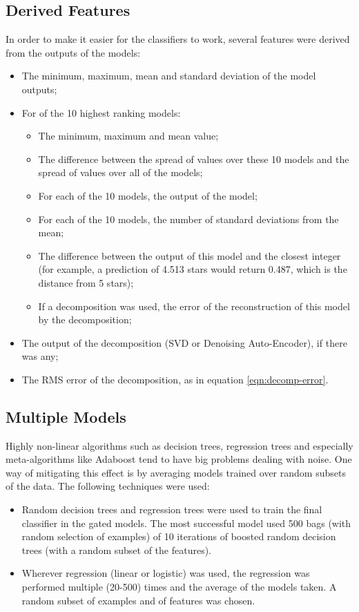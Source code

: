 \documentclass{article}
\begin{document}
\subsection{Derived Features}

In order to make it easier for the classifiers to work, several features were derived from the outputs of the models:

\begin{itemize}
\item The minimum, maximum, mean and standard deviation of the model outputs;
\item For of the 10 highest ranking models:
  \begin{itemize}
    \item The minimum, maximum and mean value;
    \item The difference between the spread of values over these 10 models and the spread of values over all of the models;
    \item For each of the 10 models, the output of the model;
    \item For each of the 10 models, the number of standard deviations from the mean;
    \item The difference between the output of this model and the closest integer (for example, a prediction of 4.513 stars would return 0.487, which is the distance from 5 stars);
    \item If a decomposition was used, the error of the reconstruction of this model by the decomposition;
  \end{itemize}
\item The output of the decomposition (SVD or Denoising Auto-Encoder), if there was any;
\item The RMS error of the decomposition, as in equation \ref{eqn:decomp-error}.

\end{itemize}

\subsection{Multiple Models}

Highly non-linear algorithms such as decision trees, regression trees and especially meta-algorithms like Adaboost tend to have big problems dealing with noise.
One way of mitigating this effect is by averaging models trained over random subsets of the data.  The following techniques were used:

\begin{itemize}
\item Random decision trees and regression trees were used to train the final classifier in the gated models.  The most successful model used 500 bags (with random selection of examples) of 10 iterations of boosted random decision trees (with a random subset of the features).
\item Wherever regression (linear or logistic) was used, the regression was performed multiple (20-500) times and the average of the models taken.  A random subset of examples and of features was chosen.
\end{itemize}
\end{document}
